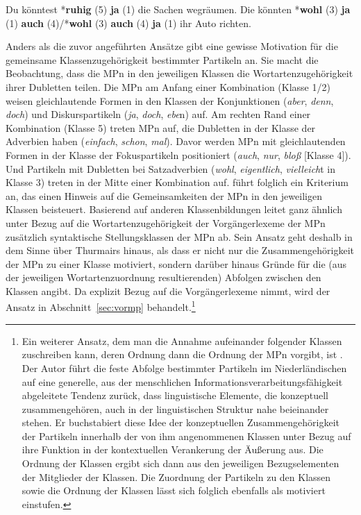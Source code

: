 \begin{exe}
	\ex\label{29} 
		\begin{xlist}	
			\ex\label{29a} Du könntest *\textbf{ruhig} (5) \textbf{ja} (1) die Sachen wegräumen.
			\ex\label{29b} Die könnten *\textbf{wohl} (3) \textbf{ja} (1) \textbf{auch} (4)/*\textbf{wohl} (3) \textbf{auch} (4) \textbf{ja} (1) ihr Auto 				richten.		
	\hfill\hbox{\citet[29]{Thurmair1991}}	
	\end{xlist}
\end{exe}
Anders als die zuvor angeführten Ansätze gibt \citet{Thurmair1991} eine gewisse Motivation für die gemeinsame Klassenzugehörigkeit bestimmter Partikeln an. Sie macht die Beobachtung, dass die MPn in den jeweiligen Klassen die Wortartenzugehörigkeit ihrer \glq Dubletten\grq {} teilen. Die MPn am Anfang einer Kombination (Klasse 1/2) weisen gleichlautende Formen in den Klassen der Konjunktionen (\textit{aber}, \textit{denn}, \textit{doch}) und Diskurspartikeln (\textit{ja}, \textit{doch}, \textit{ebe}n) auf. Am rechten Rand einer Kombination (Klasse 5) treten MPn auf, die \glq Dubletten\grq {} in der Klasse der Adverbien haben (\textit{einfach}, \textit{schon}, \textit{mal}). Davor werden MPn mit gleichlautenden Formen in der Klasse der Fokuspartikeln positioniert (\textit{auch}, \textit{nur}, \textit{bloß} [Klasse 4]). Und Partikeln mit \glq Dubletten\grq {} bei Satzadverbien (\textit{wohl}, \textit{eigentlich}, \textit{vielleich}t in Klasse 3) treten in der Mitte einer Kombination auf. \citet{Thurmair1991} führt folg\-lich ein Kriterium an, das einen Hinweis auf die Gemeinsamkeiten der MPn in den jeweiligen Klassen beisteuert. Basierend auf anderen Klassenbildungen leitet \citet{Abraham1995} ganz ähnlich unter Bezug auf die Wortartenzugehörigkeit der Vorgängerlexeme der MPn zusätzlich syntaktische Stellungsklassen der MPn ab. Sein Ansatz geht deshalb in dem Sinne über Thurmairs hinaus, als dass er nicht nur die Zusammengehörigkeit der MPn zu einer Klasse motiviert, sondern darüber hinaus Gründe für die (aus der jeweiligen Wortartenzuordnung resultierenden) Abfolgen zwischen den Klassen angibt. Da \citet{Abraham1995} explizit Bezug auf die Vorgängerlexeme nimmt, wird der Ansatz in Abschnitt~\ref{sec:vormp} behandelt.\footnote{Ein weiterer Ansatz, dem man die Annahme aufeinander folgender Klassen zuschreiben kann, deren Ordnung dann die Ordnung der MPn vorgibt, ist \citet[203-206]{Verschueren2003}. Der Autor führt die feste Abfolge bestimmter Partikeln im Niederländischen auf eine generelle, aus der menschlichen Informationsverarbeitungsfähigkeit abgeleitete Tendenz zurück, dass linguistische Elemente, die konzeptuell zusammengehören, auch in der linguistischen Struktur nahe beieinander stehen. Er buchstabiert diese Idee der konzeptuellen Zusammengehörigkeit der Partikeln innerhalb der von ihm angenommenen Klassen unter Bezug auf ihre Funktion in der kontextuellen Verankerung der Äußerung aus. Die Ordnung der Klassen ergibt sich dann aus den jeweiligen Bezugselementen der Mitglieder der Klassen. Die Zuordnung der Partikeln zu den Klassen sowie die Ordnung der Klassen lässt sich folglich ebenfalls als motiviert einstufen. }
